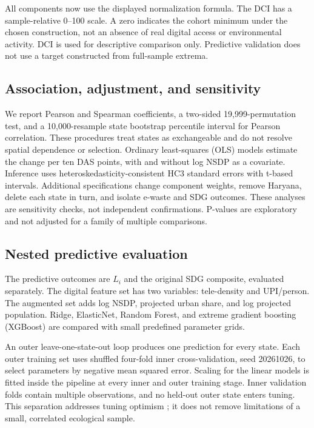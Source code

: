 \documentclass[11pt,a4paper]{article}
\begin{document}
All components now use the displayed normalization formula. The DCI has a sample-relative 0--100 scale. A zero indicates the cohort minimum under the chosen construction, not an absence of real digital access or environmental activity. DCI is used for descriptive comparison only. Predictive validation does not use a target constructed from full-sample extrema.

\subsection{Association, adjustment, and sensitivity}
We report Pearson and Spearman coefficients, a two-sided 19,999-permutation test, and a 10,000-resample state bootstrap percentile interval for Pearson correlation. These procedures treat states as exchangeable and do not resolve spatial dependence or selection. Ordinary least-squares (OLS) models estimate the change per ten DAS points, with and without log NSDP as a covariate. Inference uses heteroskedasticity-consistent HC3 standard errors with t-based intervals. Additional specifications change component weights, remove Haryana, delete each state in turn, and isolate e-waste and SDG outcomes. These analyses are sensitivity checks, not independent confirmations. P-values are exploratory and not adjusted for a family of multiple comparisons.

\subsection{Nested predictive evaluation}
The predictive outcomes are $L_i$ and the original SDG composite, evaluated separately. The digital feature set has two variables: tele-density and UPI/person. The augmented set adds log NSDP, projected urban share, and log projected population. Ridge, ElasticNet, Random Forest, and extreme gradient boosting (XGBoost) \cite{xgboost} are compared with small predefined parameter grids.

An outer leave-one-state-out loop produces one prediction for every state. Each outer training set uses shuffled four-fold inner cross-validation, seed 20261026, to select parameters by negative mean squared error. Scaling for the linear models is fitted inside the pipeline at every inner and outer training stage. Inner validation folds contain multiple observations, and no held-out outer state enters tuning. This separation addresses tuning optimism \cite{varma}; it does not remove limitations of a small, correlated ecological sample.
\end{document}
